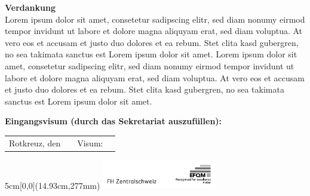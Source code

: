 \vspace{0.8cm}
\noindent
\textbf{Verdankung}
\\
Lorem ipsum dolor sit amet, consetetur sadipscing elitr, sed diam nonumy eirmod tempor invidunt ut labore et dolore magna aliquyam erat, sed diam voluptua. At vero eos et accusam et justo duo dolores et ea rebum. Stet clita kasd gubergren, no sea takimata sanctus est Lorem ipsum dolor sit amet. Lorem ipsum dolor sit amet, consetetur sadipscing elitr, sed diam nonumy eirmod tempor invidunt ut labore et dolore magna aliquyam erat, sed diam voluptua. At vero eos et accusam et justo duo dolores et ea rebum. Stet clita kasd gubergren, no sea takimata sanctus est Lorem ipsum dolor sit amet.

\vspace{0.8cm}
\noindent
\textbf{Eingangsvisum (durch das Sekretariat auszufüllen):}

\noindent
\renewcommand{\arraystretch}{2}
\begin{tabularx}{\textwidth}{@{}lXlX}
	Rotkreuz, den & & Visum: & \\
	\cline{2-2}
	\cline{4-4}
\end{tabularx}
\renewcommand{\arraystretch}{1}



% 
% 

\begin{textblock*}{5cm}[0,0](14.93cm,277mm)
	\includegraphics[keepaspectratio,width=5cm]{img/FHZ_Logo}
\end{textblock*}
